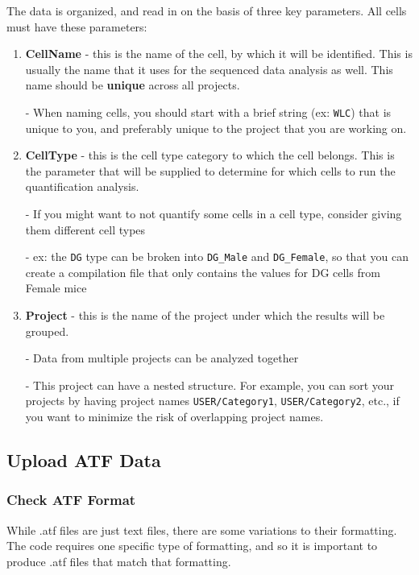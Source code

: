 \documentclass{article}
\begin{document}
The data is organized, and read in on the basis of three key parameters. All cells must have these parameters:
\begin{enumerate}
    \item \textbf{CellName} - this is the name of the cell, by which it will be identified. This is usually the name that it uses for the sequenced data analysis as well. This name should be \textbf{unique} across all projects.
    
    - When naming cells, you should start with a brief string (ex: \verb|WLC|) that is unique to you, and preferably unique to the project that you are working on.
    
    \item \textbf{CellType} - this is the cell type category to which the cell belongs. This is the parameter that will be supplied to determine for which cells to run the quantification analysis.
    
    - If you might want to not quantify some cells in a cell type, consider giving them different cell types
    
    - ex: the \verb|DG| type can be broken into \verb|DG_Male| and \verb|DG_Female|, so that you can create a compilation file that only contains the values for DG cells from Female mice
    
    \item \textbf{Project} - this is the name of the project under which the results will be grouped.
    
    - Data from multiple projects can be analyzed together
    
    - This project can have a nested structure. For example, you can sort your projects by having project names \verb|USER/Category1|, \verb|USER/Category2|, etc., if you want to minimize the risk of overlapping project names.
\end{enumerate}

\subsection{Upload ATF Data} \label{Upload ATF}

\subsubsection{Check ATF Format}

While .atf files are just text files, there are some variations to their formatting. The code requires one specific type of formatting, and so it is important to produce .atf files that match that formatting.
\end{document}
